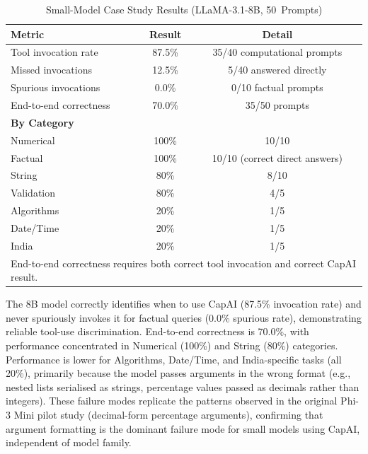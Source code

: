 \documentclass[conference]{IEEEtran}
\begin{document}
\begin{table}[htbp]
  \centering
  \caption{Small-Model Case Study Results (LLaMA-3.1-8B, 50~Prompts)}
  \label{tab:casestudy}
  \renewcommand{\arraystretch}{1.2}
  \begin{tabular}{lcc}
    \toprule
    \textbf{Metric} & \textbf{Result} & \textbf{Detail} \\
    \midrule
    Tool invocation rate   & 87.5\% & 35/40 computational prompts \\
    Missed invocations     & 12.5\% & 5/40 answered directly \\
    Spurious invocations   & 0.0\%  & 0/10 factual prompts \\
    End-to-end correctness & 70.0\% & 35/50 prompts \\
    \midrule
    \multicolumn{3}{l}{\textbf{By Category}} \\
    \midrule
    Numerical   & 100\% & 10/10 \\
    Factual     & 100\% & 10/10 (correct direct answers) \\
    String      &  80\% & 8/10 \\
    Validation  &  80\% & 4/5  \\
    Algorithms  &  20\% & 1/5  \\
    Date/Time   &  20\% & 1/5  \\
    India       &  20\% & 1/5  \\
    \bottomrule
    \multicolumn{3}{l}{\footnotesize End-to-end correctness requires both
      correct tool invocation and correct CapAI result.}
  \end{tabular}
\end{table}

The 8B model correctly identifies when to use CapAI (87.5\% invocation
rate) and never spuriously invokes it for factual queries (0.0\% spurious
rate), demonstrating reliable tool-use discrimination.
End-to-end correctness is 70.0\%, with performance concentrated in
Numerical (100\%) and String (80\%) categories.
Performance is lower for Algorithms, Date/Time, and India-specific tasks
(all 20\%), primarily because the model passes arguments in the wrong
format (e.g., nested lists serialised as strings, percentage values
passed as decimals rather than integers).
These failure modes replicate the patterns observed in the original
Phi-3 Mini pilot study (decimal-form percentage arguments), confirming
that argument formatting is the dominant failure mode for small models
using CapAI, independent of model family.
\end{document}
